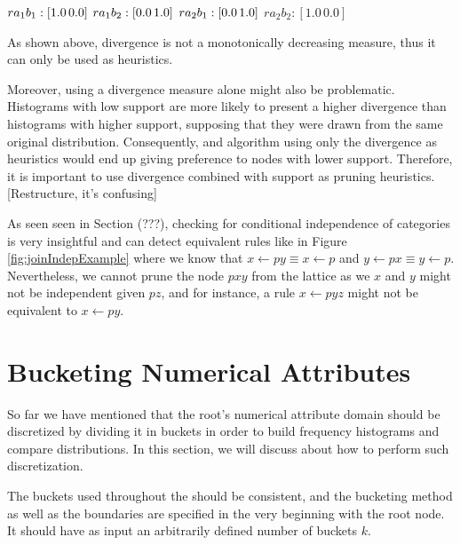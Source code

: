 $r a_1 b_1 : [1.0 \, 0.0] \\$
$r a_1 b_2 : [0.0 \, 1.0] \\$
$r a_2 b_1 : [0.0 \, 1.0] \\$
$r a_2 b_2 : [1.0 \, 0.0]$

As shown above, divergence is not a monotonically decreasing measure, thus it can only be used as heuristics.


Moreover, using a divergence measure alone might also be problematic. Histograms with low support are more likely to
present a higher divergence than histograms with higher support, supposing that they were drawn from the same original
distribution. Consequently, and algorithm using only the divergence as heuristics would end up giving preference to
nodes with lower support. Therefore, it is important to use divergence combined with support as pruning heuristics.
[Restructure, it's confusing]




As seen seen in Section (???), checking for conditional independence of categories is very insightful and
can detect equivalent rules like in Figure \ref{fig:joinIndepExample} where we know that 
$x \leftarrow py \equiv x \leftarrow p$ and $y \leftarrow px \equiv y \leftarrow p$. Nevertheless, we cannot prune the
node $pxy$ from the lattice as we $x$ and $y$ might not be independent given $pz$, and for instance, a rule $x
\leftarrow pyz$ might not be equivalent to $x \leftarrow py$. 

\section{Bucketing Numerical Attributes}

So far we have mentioned that the root's numerical attribute domain should be discretized by dividing it in buckets in
order to build frequency histograms and compare distributions. In this section, we will discuss about how to perform
such discretization.

The buckets used throughout the \graphname should be consistent, and the bucketing method as well as the boundaries are
specified in the very beginning with the root node. It should have as input an arbitrarily defined number of buckets
$k$.

